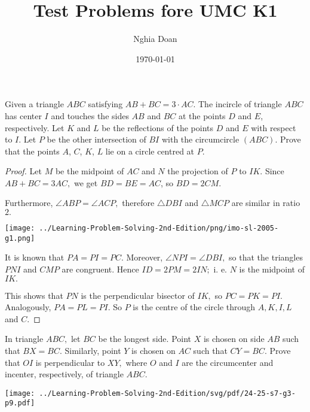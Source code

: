 \documentclass{article}
\title{Test Problems fore UMC K1}
\author{Nghia Doan}
\date{\today}
\begin{document}
\maketitle

\begin{problem}
    Given a triangle $ABC$ satisfying $AB+BC=3\cdot AC$.
    The incircle of triangle $ABC$ has center $I$ and touches the sides $AB$ and $BC$ at the points $D$ and $E$, respectively.
    Let $K$ and $L$ be the reflections of the points $D$ and $E$ with respect to $I$.
    Let $P$ be the other intersection of $BI$ with the circumcircle $(ABC).$
    Prove that the points $A$, $C$, $K$, $L$ lie on a circle centred at $P.$
\end{problem}

\begin{proof}
    Let $M$ be the midpoint of $AC$ and $N$ the projection of $P$ to $IK.$
    Since $AB + BC = 3AC,$ we get $BD = BE = AC$, so $BD = 2CM.$

    Furthermore, $\angle ABP = \angle ACP,$ therefore $\triangle DBI$ and $\triangle MCP$ are similar in ratio $2.$
    \begin{center}
        \texttt{[image: ../Learning-Problem-Solving-2nd-Edition/png/imo-sl-2005-g1.png]}
    \end{center}

    It is known that $PA = PI = PC.$
    Moreover, $\angle NPI = \angle DBI,$ so that the triangles $PNI$ and $CMP$ are congruent.
    Hence $ID = 2PM = 2IN;$ i. e. $N$ is the midpoint of $IK.$

    This shows that $PN$ is the perpendicular bisector of $IK,$ so $PC = PK = PI.$
    Analogously, $PA = PL = PI.$ So $P$ is the centre of the circle through $A, K, I, L$ and $C.$
\end{proof}

\newpage

\begin{problem}
    In triangle $ABC,$ let $BC$ be the longest side. Point $X$ is chosen on side $AB$ such that $BX = BC.$
    Similarly, point $Y$ is chosen on $AC$ such that $CY = BC.$
    Prove that $OI$ is perpendicular to $XY,$ where $O$ and $I$ are the circumcenter and incenter, respectively, of triangle $ABC.$
\end{problem}

\begin{center}
    \texttt{[image: ../Learning-Problem-Solving-2nd-Edition/svg/pdf/24-25-s7-g3-p9.pdf]}
\end{center}
\end{document}
